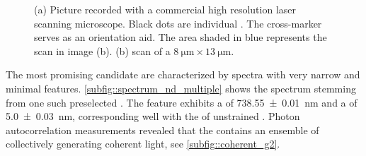 			\begin{figure}[htp]
				\begin{subfigure}[t]{ 0.49\linewidth}
					\centering
					\caption{}
					\label{subfig::cross_laser_scan}
				\end{subfigure}
				\hfill
				\begin{subfigure}[t]{ 0.49\linewidth}
					\centering
					\caption{}
					\label{subfig::pp_pl_scan}
				\end{subfigure}
				\caption[Localizing suitable \nds]{(a) Picture recorded with a commercial high resolution laser scanning microscope. Black dots are individual \nds. The cross-marker serves as an orientation aid. The area shaded in blue represents the \pl scan in image (b). (b) \Pl scan of a
				$\SI{8}{\micro\metre} \times \SI{13}{\micro\metre}$. }
			\end{figure}

			The most promising candidate \nds are characterized by \fl spectra with very narrow \zpls and minimal \psb features. 
			\cref{subfig::spectrum_nd_multiple} shows the spectrum stemming from one such preselected \nd.
			The \ZPL feature exhibits a \cwl of \SI[separate-uncertainty = true]{738.55\pm0.01}{nm} and a \lw of \SI[separate-uncertainty = true]{5.0\pm0.03}{nm}, corresponding well with the \ZPL of unstrained \sivs. Photon autocorrelation measurements revealed that the \nd  contains an ensemble of \sivs collectively generating coherent \fl light, see \cref{subfig::coherent_g2}.

